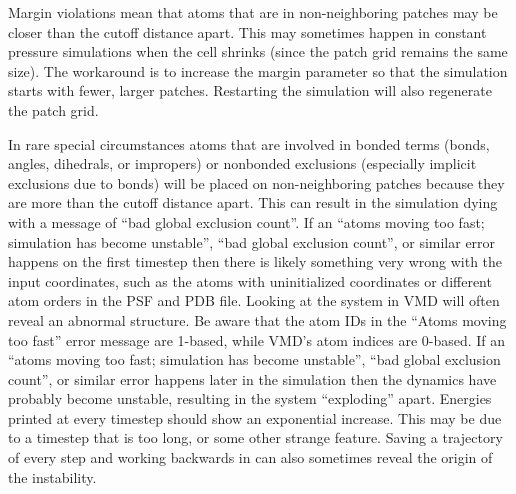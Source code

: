 Margin violations mean that atoms that are in non-neighboring patches may
be closer than the cutoff distance apart.  This may sometimes happen in
constant pressure simulations when the cell shrinks (since the patch grid
remains the same size).  The workaround is to increase the margin
parameter so that the simulation starts with fewer, larger patches.
Restarting the simulation will also regenerate the patch grid.

In rare special circumstances atoms that are involved in bonded terms
(bonds, angles, dihedrals, or impropers) or nonbonded exclusions (especially
implicit exclusions due to bonds) will be placed on non-neighboring
patches because they are more than the cutoff distance apart.  This can
result in the simulation dying with a message of
``bad global exclusion count''.
If an ``atoms moving too fast; simulation has become unstable'',
``bad global exclusion count'', or similar error happens
on the first timestep then there is likely something very
wrong with the input coordinates, such as the atoms with uninitialized
coordinates or different atom orders in the PSF and PDB file.  Looking at
the system in VMD will often reveal an abnormal structure.
Be aware that the atom IDs in the ``Atoms moving too fast'' error
message are 1-based, while VMD's atom indices are 0-based.
If an ``atoms moving too fast; simulation has become unstable'',
``bad global exclusion count'', or similar error happens
later in the simulation then the dynamics have
probably become unstable, resulting in the system ``exploding'' apart.
Energies printed at every timestep should show an exponential increase.
This may be due to a timestep that is too long, or some other strange
feature.  Saving a trajectory of every step and working backwards in
can also sometimes reveal the origin of the instability.


